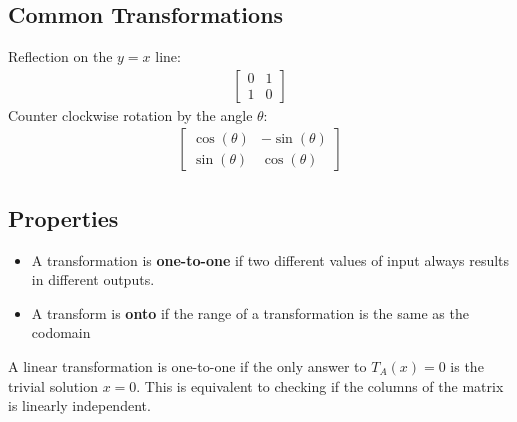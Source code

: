 \documentclass{article}
\theoremstyle{mytheoremstyle}
\theoremstyle{mytheoremstyle}
\theoremstyle{myproblemstyle}
\begin{document}
    \subsection*{Common Transformations}
    Reflection on the $y=x$ line:
    \begin{align*}
        \begin{bmatrix}
            0 & 1 \\
            1 & 0
        \end{bmatrix}
    \end{align*}
    Counter clockwise rotation by the angle $\theta$:
    \begin{align*}
        \begin{bmatrix}
            \cos(\theta) & -\sin(\theta) \\
            \sin(\theta) & \cos(\theta)
        \end{bmatrix}
    \end{align*}

    \subsection*{Properties}
    \begin{itemize}
        \item A transformation is \textbf{one-to-one} if two different values of
            input always results in different outputs.

        \item A transform is \textbf{onto} if the range of a transformation is
            the same as the codomain
    \end{itemize}
    A linear transformation is one-to-one if the only answer to $T_A(x)=0$
    is the trivial solution $x=0$. This is equivalent to checking if the
    columns of the matrix is linearly independent.
\end{document}
